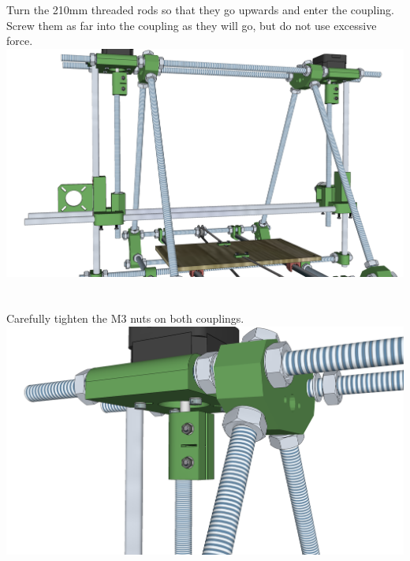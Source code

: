 \documentclass[twoside,openany,a4paper,titlepage]{memoir}
\begin{document}
	\section{}
	Turn the 210mm threaded rods so that they go upwards and enter the coupling. Screw them as far into
	the coupling as they will go, but do not use excessive force.\\
	\includegraphics[width=1\linewidth]{graphics/ch8_21.png}
	
	\section{}
	Carefully tighten the M3 nuts on both couplings.\\
	\includegraphics[width=1\linewidth]{graphics/ch8_22.png}
	
\end{document}
